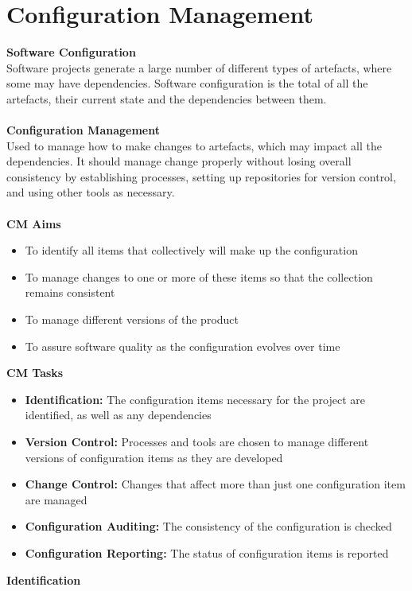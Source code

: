\documentclass[a4paper,10pt]{article}
\begin{document}
\section*{Configuration Management}	
\textcolor{BlueGreen}{\textbf{Software Configuration}} \\ 
Software projects generate a large number of different types of artefacts, where some may have dependencies. Software configuration is the total of all the artefacts, their current state and the dependencies between them. \\\\
\textcolor{BlueGreen}{\textbf{Configuration Management}} \\ 
Used to manage how to make changes to artefacts, which may impact all the dependencies. It should manage change properly without losing overall consistency by establishing processes, setting up repositories for version control, and using other tools as necessary. \\\\
\textcolor{BlueGreen}{\textbf{CM Aims}} 
\begin{itemize}
	\item To identify all items that collectively will make up the configuration 
	\item To manage changes to one or more of these items so that the collection remains consistent 
	\item To manage different versions of the product 
	\item To assure software quality as the configuration evolves over time 
\end{itemize}
\textcolor{BlueGreen}{\textbf{CM Tasks}}
\begin{itemize}
	\item \textbf{Identification:} The configuration items necessary for the project are identified, as well as any dependencies 
	\item \textbf{Version Control:} Processes and tools are chosen to manage different versions of configuration items as they are developed 
	\item \textbf{Change Control:} Changes that affect more than just one configuration item are managed 
	\item \textbf{Configuration Auditing:} The consistency of the configuration is checked 
	\item \textbf{Configuration Reporting:} The status of configuration items is reported
\end{itemize}
\textcolor{BlueGreen}{\textbf{Identification}} \\ 
\end{document}
